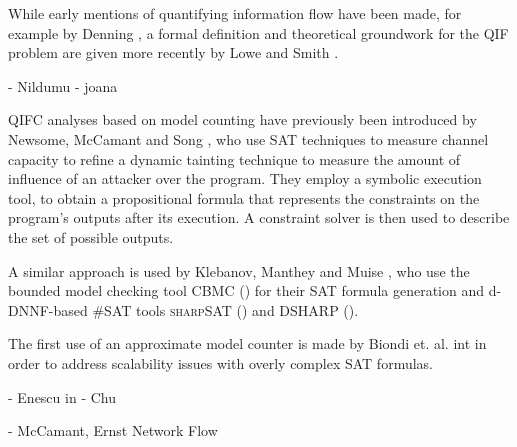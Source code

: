 While early mentions of quantifying information flow have been made, for example by Denning \cite{denning82}, a formal definition and theoretical groundwork for the QIF problem are given more recently by Lowe \cite{lowe02} and Smith \cite{smith09}.


- Nildumu
- joana



QIFC analyses based on model counting have previously been introduced by Newsome, McCamant and Song \cite{newsome09}, who use SAT techniques to measure channel capacity to refine a dynamic tainting technique to measure the amount of influence of an attacker over the program. They employ a symbolic execution tool, to obtain a propositional formula that represents the constraints on the program's outputs after its execution. A constraint solver is then used to describe the set of possible outputs.

A similar approach is used by Klebanov, Manthey and Muise \cite{klebanov13}, who use the bounded model checking tool CBMC (\cite{cbmc}) for their SAT formula generation and d-DNNF-based \#SAT tools \textsc{sharp}SAT (\cite{}) and \textsc{DSHARP} (\cite{}).


The first use of an approximate model counter is made by Biondi et. al. int \cite{biondi18} in order to address scalability issues with overly complex SAT formulas.

- Enescu in \cite{enescu16}
- Chu \cite{chu19}



- McCamant, Ernst Network Flow